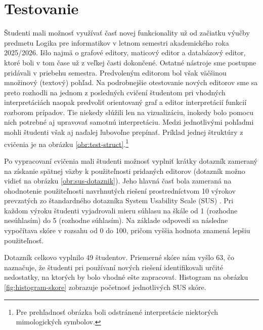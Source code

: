 \chapter{Testovanie}
\label{kap:testovanie}
Študenti mali možnosť využívať časť novej funkcionality už od začiatku výučby predmetu Logika pre informatikov v letnom semestri akademického roka 2025/2026. Išlo najmä o grafové editory, maticový editor a databázový editor, ktoré boli v tom čase už z veľkej časti dokončené. Ostatné nástroje sme postupne pridávali v priebehu semestra. Predvoleným editorom bol však väčšinou množinový (textový) pohľad. Na podrobnejšie otestovanie nových editorov sme sa preto rozhodli na jednom z posledných cvičení študentom pri vhodných interpretáciách naopak predvoliť orientovaný graf a editor interpretácií funkcií rozborom prípadov. Tie niekedy slúžili len na vizualizáciu, inokedy bolo pomocu nich potrebné aj upravovať samotnú interpretáciu. Medzi jednotlivými pohľadmi mohli študenti však aj naďalej ľubovoľne prepínať. Príklad jednej štruktúry z cvičenia je na obrázku \ref{obr:test-struct}.\footnote{Pre prehľadnosť obrázka boli odstránené interpretácie niektorých mimologických symbolov.}

Po vypracovaní cvičenia mali študenti možnosť vyplniť krátky dotazník zameraný na získanie spätnej väzby k použiteľnosti pridaných editorov (dotazník možno vidieť na obrázku \ref{obr:sus-dotaznik}). Jeho hlavná časť bola zameraná na ohodnotenie použiteľnosti navrhnutých riešení prostredníctvom 10 výrokov prevzatých zo štandardného dotazníka System Usability Scale (SUS) \cite{sus}. Pri každom výroku študenti vyjadrovali mieru súhlasu na škále od 1 (rozhodne nesúhlasím) do 5 (rozhodne súhlasím). Na základe odpovedí sa následne vypočítava skóre v rozsahu od 0 do 100, pričom vyššia hodnota znamená lepšiu použiteľnosť.

Dotazník celkovo vyplnilo 49 študentov. Priemerné skóre nám vyšlo 63, čo naznačuje, že študenti pri používaní nových riešení identifikovali určité nedostatky, na ktorých by bolo vhodné ešte zapracovať. Histogram na obrázku \ref{fig:histogram-skore} zobrazuje početnosť jednotlivých SUS skóre.

